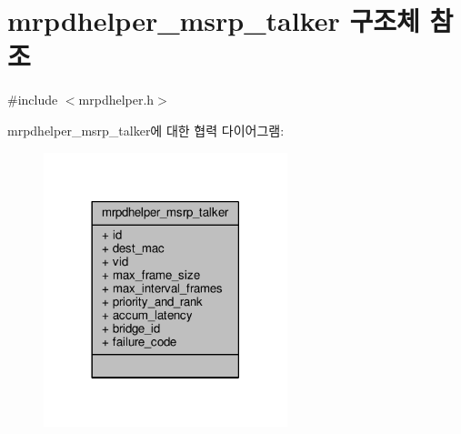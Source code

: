 \hypertarget{structmrpdhelper__msrp__talker}{}\section{mrpdhelper\+\_\+msrp\+\_\+talker 구조체 참조}
\label{structmrpdhelper__msrp__talker}


{\ttfamily \#include $<$mrpdhelper.\+h$>$}



mrpdhelper\+\_\+msrp\+\_\+talker에 대한 협력 다이어그램\+:
\nopagebreak
\begin{figure}[H]
\begin{center}
\leavevmode
\includegraphics[width=201pt]{structmrpdhelper__msrp__talker__coll__graph}
\end{center}
\end{figure}
